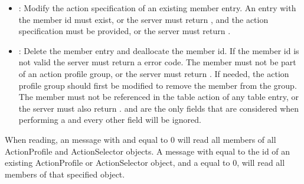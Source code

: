 \documentclass[11pt]{article}
\begin{document}
{\begin{itemize}[noitemsep,topsep=\mdcompacttopsep]
\item{}: Modify the action specification of an existing member entry. An
entry with the member id must exist, or the server must return ,
and the action specification must be provided, or the server must return
.%

\item{}: Delete the member entry and deallocate the member id. If the member
id is not valid the server must return a  error code. The member
must not be part of an action profile group, or the server must return
. If needed, the action profile group should first be
modified to remove the member from the group. The member must not be
referenced in the table action of any table entry, or the server must also
return .  and  are the only
fields that are considered when performing a  and every other field
will be ignored.%
\end{itemize}%

\noindent{}When reading, an  message with  and
 equal to 0 will read all members of all ActionProfile and
ActionSelector objects.  A message with  equal to the id of
an existing ActionProfile or ActionSelector object, and a  equal to
0, will read all members of that specified object.%

}
\end{document}
